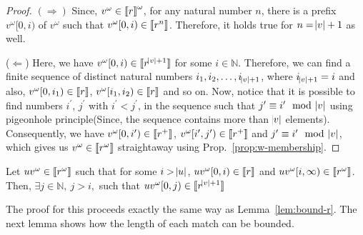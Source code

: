 \begin{proof}
$(\Rightarrow)$  Since, $v^\omega\in {\llbracket}r{\rrbracket}^\omega$, for any natural number $n$, there is a prefix $v^\omega[0,i)$ of $v^\omega$ such that $v^\omega[0,i)\in {\llbracket}r^n{\rrbracket}$. Therefore, it holds true for $n=\abs{v}+1$ as well.

($\Leftarrow$) Here, we have $v^\omega[0,i)\in {\llbracket}r^{\abs{v}+1}{\rrbracket}$ for some $i\in \mathbb{N}$. Therefore, we can find a finite sequence of distinct natural numbers $i_1, i_2, \ldots, i_{\abs{v}+1}$, where $i_{\abs{v}+1}=i$ and also, $v^\omega[0,i_1)\in {\llbracket}r{\rrbracket}$, $v^\omega[i_1,i_2)\in {\llbracket}r{\rrbracket}$ and so on. Now, notice that it is possible to find numbers $i^{\prime}$, $j^{\prime}$ with $i^\prime<j^\prime$, in the sequence such that $j^{\prime}\equiv i^{\prime} \mod \abs{v}$ using pigeonhole principle(Since, the sequence contains more than $\abs{v}$ elements). Consequently, we have $v^\omega[0,i^{\prime})\in{\llbracket}r^+{\rrbracket}$, $v^\omega[i^{\prime},j^{\prime})\in{\llbracket}r^+{\rrbracket}$ and $j^{\prime}\equiv i^{\prime} \mod \abs{v}$, which gives us $v^\omega\in{\llbracket}r^\omega{\rrbracket}$ straightaway using Prop.~\ref{prop:w-membership}.
\end{proof}
\begin{corollary}\label{cor:bound-r-uv}
Let $uv^{\omega}\in {\llbracket}r^\omega{\rrbracket}$ such that for some $i> \abs{u}$, $uv^\omega[0,i)\in{\llbracket}r{\rrbracket}$ and $uv^\omega[i,\infty)\in{\llbracket}r^\omega{\rrbracket}$. Then, $\exists j \in \mathbb{N},\ j>i,$ such that $uv^\omega[0,j)\in {\llbracket}r^{\abs{v}+1}{\rrbracket}$
\end{corollary}
The proof for this proceeds exactly the same way as Lemma~\ref{lem:bound-r}. The next lemma shows how the length of each match can be bounded.
